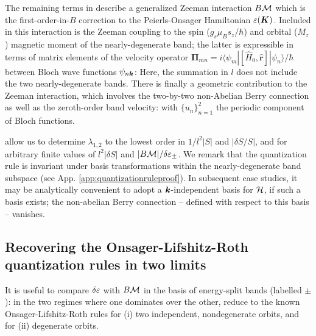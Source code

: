 \documentclass[aps, showpacs, twocolumn, notitlepage, superscriptaddress]{revtex4-1}
\begin{document}
The remaining terms in  describe a generalized Zeeman interaction $B{\cal M}$ which is the first-order-in-$B$ correction to the Peierls-Onsager Hamiltonian $\varepsilon(\boldsymbol{K})$\cite{rotheffham,blount_effham,kohn_effham}. Included in this interaction is the Zeeman coupling to the spin ($g_s\mu_Bs_z/\hbar$) and orbital ($M_z$) magnetic moment\cite{thonhauser_orbital_2005} of the nearly-degenerate band; the latter is expressible in terms of matrix elements of the velocity operator $\boldsymbol{\Pi}_{mn}=i\langle\psi_m|[\hat{H}_0, \hat{\boldsymbol{r}}]|\psi_n\rangle/\hbar$ between Bloch wave functions $\psi_{n\boldsymbol{k}}$:
Here, the summation in $l$ does not include the two nearly-degenerate bands.  There is finally a geometric contribution to the Zeeman interaction, which involves the two-by-two non-Abelian Berry connection\cite{berry_quantal_1984,wilczek_appearance_1984} as well as the  zeroth-order band velocity: 
with $\{u_n\}_{n=1}^2$ the periodic component of Bloch functions. 

 allow us to determine $\lambda_{1,2}$ to the lowest order  in $1/l^2|S|$ and $|\delta S/S|$, and for arbitrary finite values of $l^2|\delta S|$ and $|B{\cal M}|/\delta \varepsilon_{\pm}$. We remark that the quantization rule is invariant under basis transformations within the nearly-degenerate band subspace (see App. \ref{app:quantizationruleproof}).  In subsequent case studies, it may be analytically convenient to adopt a $\boldsymbol{k}$-independent basis for ${\cal H}$, if such a basis exists; the non-abelian Berry connection -- defined with respect to this basis -- vanishes.

\subsection{Recovering the Onsager-Lifshitz-Roth quantization rules in two limits}\label{sec:recoveronsager}

It is useful to compare $\delta \varepsilon$ with $B{\cal M}$ in the basis of energy-split bands (labelled $\pm$): in the two regimes where one dominates over the other,  reduce to the known Onsager-Lifshitz-Roth rules for (i) two independent, nondegenerate orbits, and for (ii) degenerate orbits.  \\
\end{document}
